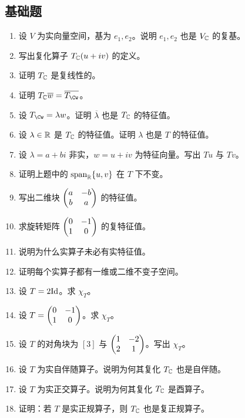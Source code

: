 \subsection*{基础题}
\begin{enumerate}[label=\textbf{\arabic*.}, leftmargin=*, itemsep=0.5em]
\item \basic 设 $V$ 为实向量空间，基为 $e_1,e_2$。说明 $e_1,e_2$ 也是 $V_{\mathbb{C}}$ 的复基。
\item \basic 写出复化算子 $T_{\mathbb{C}}(u+iv)$ 的定义。
\item \basic 证明 $T_{\mathbb{C}}$ 是复线性的。
\item \basic 证明 $T_\C\overline{w}=\overline{T_\Cw}$。
\item \basic 设 $T_\Cw=\lambda w$。证明 $\overline{\lambda}$ 也是 $T_{\mathbb{C}}$ 的特征值。
\item \basic 设 $\lambda\in\mathbb{R}$ 是 $T_{\mathbb{C}}$ 的特征值。证明 $\lambda$ 也是 $T$ 的特征值。
\item \basic 设 $\lambda=a+bi$ 非实，$w=u+iv$ 为特征向量。写出 $Tu$ 与 $Tv$。
\item \basic 证明上题中的 $\operatorname{span}_{\mathbb{R}}\{u,v\}$ 在 $T$ 下不变。
\item \basic 写出二维块 $\begin{pmatrix} a&-b\\b&a \end{pmatrix}$ 的特征值。
\item \basic 求旋转矩阵 $\begin{pmatrix} 0&-1\\1&0 \end{pmatrix}$ 的复特征值。
\item \basic 说明为什么实算子未必有实特征值。
\item \basic 证明每个实算子都有一维或二维不变子空间。
\item \basic 设 $T=2\mathrm{Id}$。求 $\chi_T$。
\item \basic 设 $T=\begin{pmatrix} 0&-1\\1&0 \end{pmatrix}$。求 $\chi_T$。
\item \basic 设 $T$ 的对角块为 $[3]$ 与 $\begin{pmatrix} 1&-2\\2&1 \end{pmatrix}$。写出 $\chi_T$。
\item \basic 设 $T$ 为实自伴随算子。说明为何其复化 $T_{\mathbb{C}}$ 也是自伴随。
\item \basic 设 $T$ 为实正交算子。说明为何其复化 $T_{\mathbb{C}}$ 是酉算子。
\item \basic 证明：若 $T$ 是实正规算子，则 $T_{\mathbb{C}}$ 也是复正规算子。
\end{enumerate}

